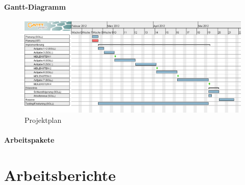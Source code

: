 \documentclass[a4paper,10pt]{article}
\begin{document}
\subsection{Gantt-Diagramm}
\begin{figure}[h!]
\centering
\includegraphics[width=1\linewidth]{img/projektplanung.png}
\caption{Projektplan}
\label{prplan}
\end{figure}

\subsection{Arbeitspakete}

\newpage

\part{Arbeitsberichte}



 
\end{document}
